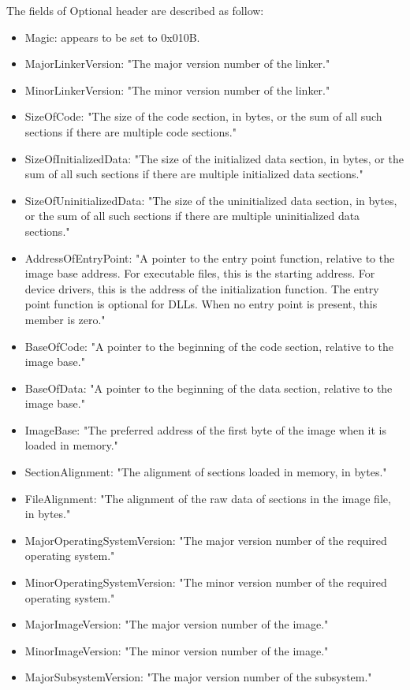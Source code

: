 The fields of Optional header are described as follow: 
\begin{itemize}
\item Magic: appears to be set to 0x010B.
\item MajorLinkerVersion: "The major version number of the linker."
\item MinorLinkerVersion: "The minor version number of the linker."
\item SizeOfCode: "The size of the code section, in bytes, or the sum of all such sections if there are multiple code sections."
\item SizeOfInitializedData: "The size of the initialized data section, in bytes, or the sum of all such sections if there are multiple initialized data sections."
\item SizeOfUninitializedData: "The size of the uninitialized data section, in bytes, or the sum of all such sections if there are multiple uninitialized data sections."
\item AddressOfEntryPoint: "A pointer to the entry point function, relative to the image base address. For executable files, this is the starting address. For device drivers, this is the address of the initialization function. The entry point function is optional for DLLs. When no entry point is present, this member is zero."
\item BaseOfCode: "A pointer to the beginning of the code section, relative to the image base."
\item BaseOfData: "A pointer to the beginning of the data section, relative to the image base."
\item ImageBase: "The preferred address of the first byte of the image when it is loaded in memory."
\item SectionAlignment: "The alignment of sections loaded in memory, in bytes."
\item FileAlignment: "The alignment of the raw data of sections in the image file, in bytes."
\item MajorOperatingSystemVersion: "The major version number of the required operating system."
\item MinorOperatingSystemVersion: "The minor version number of the required operating system."
\item MajorImageVersion: "The major version number of the image."
\item MinorImageVersion: "The minor version number of the image."
\item MajorSubsystemVersion: "The major version number of the subsystem."

\end{itemize}
